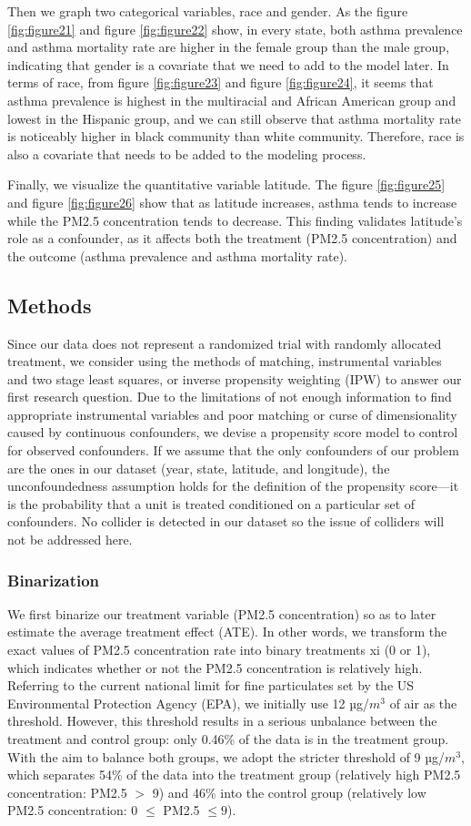 \documentclass{article}
\begin{document}
Then we graph two categorical variables, race and gender. As the figure \ref{fig:figure21} and figure \ref{fig:figure22} show, in every state, both asthma prevalence and asthma mortality rate are higher in the female group than the male group, indicating that gender is a covariate that we need to add to the model later. In terms of race, from figure \ref{fig:figure23} and figure \ref{fig:figure24}, it seems that asthma prevalence is highest in the multiracial and 
African American group and lowest in the Hispanic group, and we can still observe that asthma mortality rate is noticeably higher in black community than white community. Therefore, race is also a covariate that needs to be added to the modeling process. 

Finally, we visualize the quantitative variable latitude. The figure \ref{fig:figure25} and figure \ref{fig:figure26} show that as latitude increases, asthma tends to increase while the PM2.5 concentration tends to decrease. This finding validates latitude’s role as a confounder, as it affects both the treatment (PM2.5 concentration) and the outcome (asthma prevalence and asthma mortality rate). 

\subsection{Methods}
Since our data does not represent a randomized trial with randomly allocated treatment, we consider using the methods of matching, instrumental variables and two stage least squares, or inverse propensity weighting (IPW) to answer our first research question. Due to the limitations of not enough information to find appropriate instrumental variables and poor matching or curse of dimensionality caused by continuous confounders, we devise a propensity score model to control for observed confounders. If we assume that the only confounders of our problem are the ones in our dataset (year, state, latitude, and longitude),  the unconfoundedness assumption holds for the definition of the propensity score---it is the probability that a unit is treated conditioned on a particular set of confounders. No collider is detected in our dataset so the issue of colliders will not be addressed here. 
\subsubsection{Binarization}
We first binarize our treatment variable (PM2.5 concentration) so as to later estimate the average treatment effect (ATE). In other words, we transform the exact values of PM2.5 concentration rate into binary treatments xi (0 or 1), which indicates whether or not the PM2.5 concentration is relatively high. Referring to the current national limit for fine particulates set by the US Environmental Protection Agency (EPA), we initially use 12 µg/$m^3$ of air as the threshold. However, this threshold results in a serious unbalance between the treatment and control group: only 0.46\% of the data is in the treatment group. With the aim to balance both groups, we adopt the stricter threshold of 9 µg/$m^3$, which separates 54\% of the data into the treatment group (relatively high PM2.5 concentration: PM2.5 $>$ 9) and 46\% into the control group (relatively low PM2.5 concentration: 0 $\leq$ PM2.5 $\leq 9$). 
\end{document}
